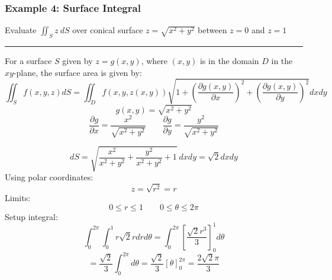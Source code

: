 \subsubsection{Example 4: Surface Integral}
Evaluate $\iint_S z\ dS$ over conical surface $z=\sqrt{x^2+y^2}$ between $z=0$ and $z=1$

\rule{\textwidth}{0.5pt}

For a surface $S$ given by $z=g(x,y)$, where $(x,y)$ is in the domain $D$ in the $xy$-plane, the surface area is given by:
$$\iint_{S}f(x,y,z)d S=\iint_{D}f(x,y,z(x,y))\sqrt{1+\left(\frac{ \partial g(x,y) }{ \partial x } \right)^{2}+\left(\frac{ \partial g(x,y) }{ \partial y } \right)^{2}}d x d y$$ 
$$g(x,y)=\sqrt{x^2+y^2}$$
$$\frac{\partial g}{\partial x}=\frac{x^2}{\sqrt{x^2+y^2}}\qquad\frac{\partial g}{\partial y}=\frac{y^2}{\sqrt{x^2+y^2}}$$

$$dS=\sqrt{\frac{x^2}{x^2+y^2}+\frac{y^2}{x^2+y^2}+1}\ dxdy=\sqrt{2}dxdy$$
Using polar coordinates:
$$z=\sqrt{r^2}=r$$
Limits:
$$0\leq r\leq 1\qquad 0\leq \theta\leq 2\pi$$
Setup integral:
$$\int_0^{2\pi}\int_0^1r\sqrt{2}rdrd\theta=\int_0^{2\pi}\left[ \frac{\sqrt{2} r^3}{3} \right]_0^1d\theta$$
$$=\frac{\sqrt{2}}{3}\int_0^{2\pi}d\theta=\frac{\sqrt{2}}{3}\left[ \theta \right]_0^{2\pi}=\frac{2\sqrt{2}\pi}{3}$$
%
